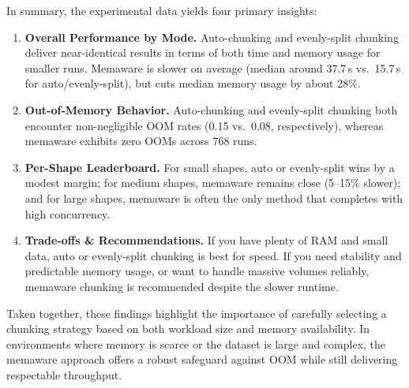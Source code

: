 In summary, the experimental data yields four primary insights:
\begin{enumerate}
    \item \textbf{Overall Performance by Mode.}
    Auto-chunking and evenly-split chunking deliver near-identical results in terms of both time and memory usage for smaller runs. Memaware is slower on average (median around 37.7\,s vs.\ 15.7\,s for auto/evenly-split), but cuts median memory usage by about 28\%.
    \item \textbf{Out-of-Memory Behavior.}
    Auto-chunking and evenly-split chunking both encounter non-negligible \ac{OOM} rates (0.15 vs.\ 0.08, respectively), whereas memaware exhibits zero \ac{OOM}s across 768 runs.
    \item \textbf{Per-Shape Leaderboard.}
    For small shapes, auto or evenly-split wins by a modest margin; for medium shapes, memaware remains close (5--15\% slower); and for large shapes, memaware is often the only method that completes with high concurrency.
    \item \textbf{Trade-offs \& Recommendations.}
    If you have plenty of RAM and small data, auto or evenly-split chunking is best for speed. If you need stability and predictable memory usage, or want to handle massive volumes reliably, memaware chunking is recommended despite the slower runtime.
\end{enumerate}

Taken together, these findings highlight the importance of carefully selecting a chunking strategy based on both workload size and memory availability.
In environments where memory is scarce or the dataset is large and complex, the memaware approach offers a robust safeguard against \ac{OOM} while still delivering respectable throughput.